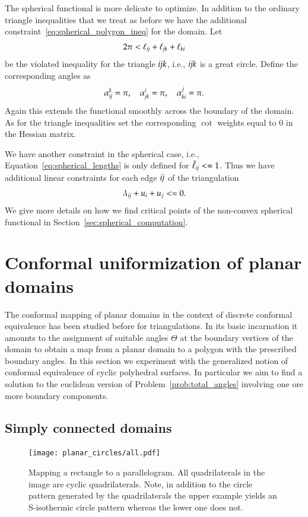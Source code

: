 \documentclass[Thesis]{subfiles}
\begin{document}
The spherical functional is more delicate to optimize.
In addition to the ordinary triangle inequalities that we treat as before we have the additional constraint~\ref{eq:spherical_polygon_ineq} for the domain.
Let 
\[2\pi < \ell_{\it ij} + \ell_{\it jk} + \ell_{\it ki}\]
be the violated inequality for the triangle $\it ijk$, i.e., $\it ijk$ is a great circle. 
Define the corresponding angles as
\begin{equation*}
\alpha^k_{\it ij} = \pi,\quad \alpha^i_{\it jk} = \pi,\quad \alpha^j_{\it ki} = \pi.
\end{equation*}
Again this extends the functional smoothly across the boundary of the domain. 
As for the triangle inequalities set the corresponding $\cot$ weights equal to $0$ in the Hessian matrix.

We have another constraint in the spherical case, i.e., Equation~\ref{eq:spherical_lengths} is only defined for $\tilde\ell_{\it ij} <= 1$.
Thus we have additional linear constraints for each edge $\it ij$ of the triangulation
\[\lambda_{\it ij} + u_i + u_j <= 0.\]
We give more details on how we find critical points of the non-convex spherical functional in Section~\ref{sec:spherical_computation}.


\section{Conformal uniformization of planar domains}

The conformal mapping of planar domains in the context of discrete conformal equivalence has been studied before for triangulations. 
In its basic incarnation it amounts to the assignment of suitable angles $\Theta$ at the boundary vertices of the domain to obtain a map from a planar domain to a polygon with the prescribed boundary angles. 
In this section we experiment with the generalized notion of conformal equivalence of cyclic polyhedral surfaces.
In particular we aim to find a solution to the euclidean version of Problem~\ref{prob:total_angles} involving one ore more boundary components.

\subsection{Simply connected domains}

\begin{figure}
\centering
\texttt{[image: planar\_circles/all.pdf]}
\\
\caption{
Mapping a rectangle to a parallelogram.
All quadrilaterals in the image are cyclic quadrilaterals.
Note, in addition to the circle pattern generated by the quadrilaterals the upper example yields an S-isothermic circle pattern whereas the lower one does not.
}
\label{fig:cyclic_parallelogram}
\end{figure}
\end{document}
